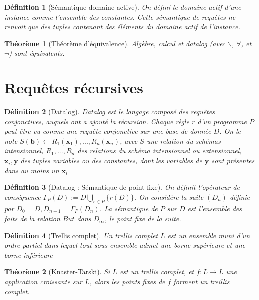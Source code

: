 \documentclass[landscape]{article}
\newcommand{\1}{\mathbbm{1}}
\newcommand{\0}{\mathbbm{0}}
\newtheorem{theo}{Théorème}
\newtheorem{defi}{Définition}
\begin{document}
\begin{multicols}{2}
    \begin{defi}[Sémantique domaine active]
        On défini le domaine actif d'une instance comme l'ensemble des constantes.
        Cette sémantique de requêtes ne renvoit que des tuples contenant des éléments
        du domaine actif de l'instance.
    \end{defi}

    \begin{theo}[Théorème d'équivalence]
        Algèbre, calcul et datalog (avec $\backslash$, $\forall$, et $\neg$) sont
        équivalents.
    \end{theo}

    \section{Requêtes récursives}

    \begin{defi}[Datalog]
      Datalog est le langage composé des requêtes conjonctives, auquels ont a
      ajouté la récursion. Chaque règle $r$ d'un programme $P$ peut être vu
      comme une requête conjonctive sur une base de donnée $D$. On le note
      $S(\mathbf{b}) \leftarrow R_1(\mathbf{x}_1),...,R_n(\mathbf{x}_n)$, avec
      $S$ une relation du schémas intensionnel, $R_1,...,R_n$ des relations du
      schéma intensionnel ou extensionnel, $\mathbf{x}_i,\mathbf{y}$ des
      tuples variables ou des constantes, dont les variables de $\mathbf{y}$
      sont présentes dans au moins un $\mathbf{x}_i$
    \end{defi}
    
    \begin{defi}[Datalog : Sémantique de point fixe]
      On définit l'opérateur de conséquence 
      $\Gamma_P(D) := D \bigcup_{r\in P}\{r(D)\}$. On considère la suite $(D_n)$
      définie par $D_0 = D, D_{n+1} = \Gamma_P(D_n)$. La sémantique de $P$ sur
      $D$ est l'ensemble des faits de la relation $But$ dans $D_\infty$, le
      point fixe de la suite.
    \end{defi}

    \begin{defi}[Trellis complet]
      Un trellis complet $L$ est un ensemble muni d'un ordre partiel dans lequel
      tout sous-ensemble admet une borne supérieure et une borne inférieure
    \end{defi}
    
    \begin{theo}[Knaster-Tarski]
      Si $L$ est un trellis complet, et $f : L \rightarrow L$ une application
      croissante sur $L$, alors les points fixes de $f$ forment un treillis complet.
    \end{theo}


\end{multicols}
\end{document}
